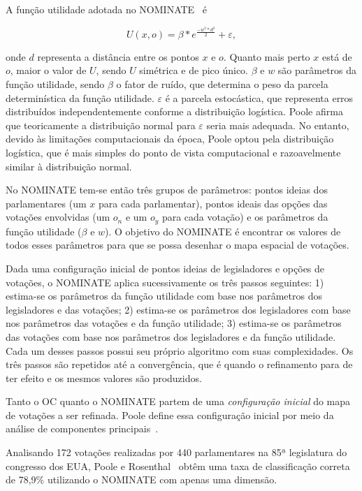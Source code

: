\documentclass[
	article,			%
	12pt,				%
	oneside,			%
	a4paper,			%
	english,			%
	brazil,				%
	sumario=tradicional,
	oldfontcommands %
	]{abntex2}
\newcommand\nominate{NOMINATE\xspace}
\begin{document}
A função utilidade adotada no \nominate~\cite{poole1985nominate} é 

\[ U(x,o) = \beta * e^{\frac{-w^2*d^2}{2}} + \varepsilon,\] 

\noindent
onde $d$ representa a distância entre os pontos $x$ e $o$. Quanto mais perto $x$ está de $o$, maior o valor de $U$, sendo $U$ simétrica e de pico único. $\beta$ e $w$ são parâmetros da função utilidade, sendo $\beta$ o fator de ruído, que determina o peso da parcela determinística da função utilidade. $\varepsilon$ é a parcela estocástica, que representa erros distribuídos independentemente conforme a distribuição logística. Poole afirma que teoricamente a distribuição normal para $\varepsilon$ seria mais adequada. No entanto, devido às limitações computacionais da época, Poole optou pela distribuição logística, que é mais simples do ponto de vista computacional e razoavelmente similar à distribuição normal.

No \nominate tem-se então três grupos de parâmetros: pontos ideias dos parlamentares (um $x$ para cada parlamentar), pontos ideais das opções das votações envolvidas (um $o_n$ e um $o_y$ para cada votação) e os parâmetros da função utilidade ($\beta$ e $w$). O objetivo do \nominate é encontrar os valores de todos esses parâmetros para que se possa desenhar o mapa espacial de votações.

Dada uma configuração inicial de pontos ideias de legisladores e opções de votações, o \nominate aplica sucessivamente os três passos seguintes: 1) estima-se os parâmetros da função utilidade com base nos parâmetros dos legisladores e das votações; 2) estima-se os parâmetros dos legisladores com base nos parâmetros das votações e da função utilidade; 3) estima-se os parâmetros das votações com base nos parâmetros dos legisladores e da função utilidade. Cada um desses passos possui seu próprio algoritmo com suas complexidades. Os três passos são repetidos até a convergência, que é quando o refinamento para de ter efeito e os mesmos valores são produzidos.

Tanto o OC quanto o \nominate partem de uma \emph{configuração inicial} do mapa de votações a ser refinada. Poole define essa configuração inicial por meio da análise de componentes principais~\cite{poole2005book}.

Analisando 172 votações realizadas por 440 parlamentares na 85ª legislatura do congresso dos EUA, Poole e Rosenthal~\cite{poole1985nominate} obtêm uma taxa de classificação correta de 78,9\% utilizando o \nominate com apenas uma dimensão.
\end{document}
